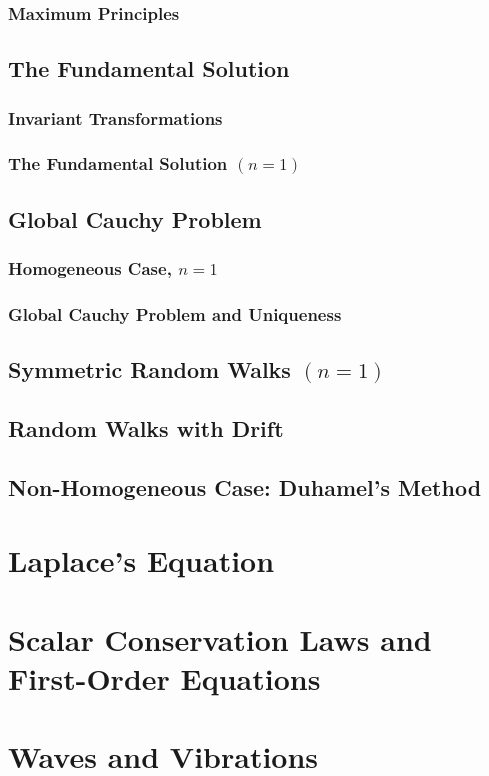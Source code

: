 \documentclass[11pt]{scrartcl}
\theoremstyle{definition}
\theoremstyle{remark}
\begin{document}
\subsubsection{Maximum Principles}
\subsection{The Fundamental Solution}
\subsubsection{Invariant Transformations}
\subsubsection{The Fundamental Solution $(n=1)$}
\subsection{Global Cauchy Problem}
\subsubsection{Homogeneous Case, $n=1$}
\subsubsection{Global Cauchy Problem and Uniqueness}
\subsection{Symmetric Random Walks $(n=1)$}
\subsection{Random Walks with Drift}
\subsection{Non-Homogeneous Case: Duhamel's Method}

\section{Laplace's Equation}
\section{Scalar Conservation Laws and First-Order Equations}
\section{Waves and Vibrations}
\end{document}
